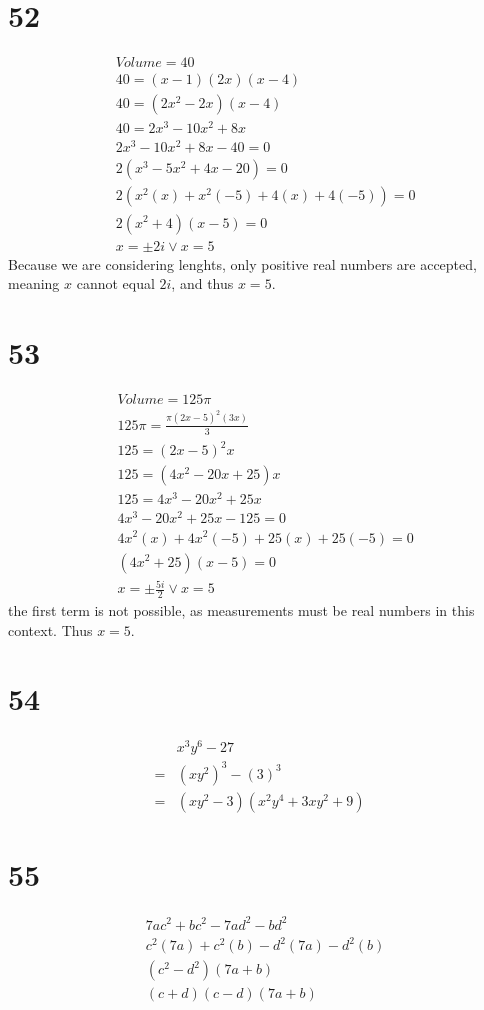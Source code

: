 \documentclass{article}
\theoremstyle{definition}
\begin{document}
\section*{52}
\[
\begin{array}{rl}
	& Volume=40 \\
	& 40=(x-1)(2x)(x-4) \\
	& 40=(2x^2-2x)(x-4) \\
	& 40=2x^3-10x^2+8x \\
	& 2x^3-10x^2+8x-40=0 \\
	& 2(x^3-5x^2+4x-20)=0 \\
	& 2(x^2(x)+x^2(-5)+4(x)+4(-5))=0 \\
	& 2(x^2+4)(x-5)=0 \\
	& x=\pm 2i\vee x=5
\end{array}
\]
Because we are considering lenghts, only positive real numbers are accepted, meaning $x$ cannot equal $2i$, and thus $x=5$.

\section*{53}
\[
\begin{array}{rl}
	& Volume=125\pi \\
	& 125\pi =\frac{\pi (2x-5)^2(3x)}{3} \\
	& 125=(2x-5)^2x \\
	& 125=(4x^2-20x+25)x \\
	& 125=4x^3-20x^2+25x \\
	& 4x^3-20x^2+25x-125=0 \\
	& 4x^2(x)+4x^2(-5)+25(x)+25(-5)=0 \\
	& (4x^2+25)(x-5)=0 \\
	& x=\pm\frac{5i}{2}\vee x=5
\end{array}
\]
the first term is not possible, as measurements must be real numbers in this context. Thus $x=5$.

\section*{54}
\[
\begin{array}{rl}
	& x^3y^6-27 \\
=	& (xy^2)^3-(3)^3 \\
=	& (xy^2-3)(x^2y^4+3xy^2+9)
\end{array}
\]

\section*{55}
\[
\begin{array}{rl}
	& 7ac^2+bc^2-7ad^2-bd^2 \\
	& c^2(7a)+c^2(b)-d^2(7a)-d^2(b) \\
	& (c^2-d^2)(7a+b) \\
	& (c+d)(c-d)(7a+b)
\end{array}
\]
\end{document}
